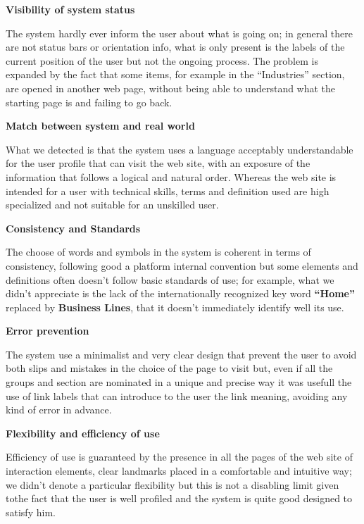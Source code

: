 \medskip

\textbf{Visibility of system status }\par
The system hardly ever inform the user about what is going on; in general there are not status bars or orientation info, what is only present is the labels of the current position of the user but not the ongoing process. The problem is expanded by the fact that some items, for example in the “Industries” section, are opened in another web page, without being able to understand what the starting page is and failing to go back.  
\medskip

\textbf{Match between system and real world}\par
What we detected is that the system uses a language acceptably understandable for the user profile that can visit the web site, with an exposure of the information that follows a logical and natural order. Whereas the web site is intended for a user with technical skills, terms and definition used are high specialized and not suitable for an unskilled user. 
\medskip

\textbf{Consistency and Standards}\par
The choose of words and symbols in the system is coherent in terms of consistency, following good a platform internal convention but some elements and definitions often doesn’t follow basic standards of use; for example, what we didn’t appreciate is the lack of the internationally recognized key word \textbf{“Home”} replaced by \textbf{Business Lines}, that it doesn’t immediately identify well its use. 
\medskip

\textbf{Error prevention}\par
The system use a minimalist and very clear design that prevent the user to avoid both slips and mistakes in the choice of the page to visit but, even if all the groups and section are nominated in a unique and precise way it was usefull the use of link labels that can introduce to the user the link meaning, avoiding any kind of error in advance. 
\medskip

\textbf{Flexibility and efficiency of use}\par
Efficiency of use is guaranteed by the presence in all the pages of the web site of interaction elements, clear landmarks placed in a comfortable and intuitive way; we didn’t denote a particular flexibility but this is not a disabling limit given tothe fact that the user is well profiled and the system is quite good designed to satisfy him. 
\medskip


